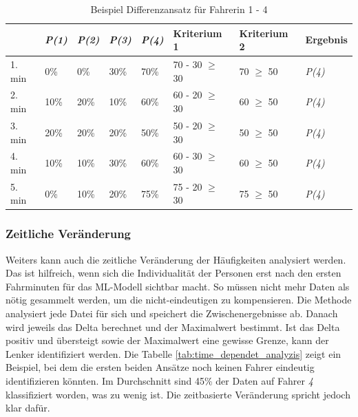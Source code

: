\begin{table}[htbp]
    \centering
    \caption{Beispiel Differenzansatz für Fahrerin 1 - 4}
    \label{tab:differencial_approach}
    \begin{tabular}{|l|l|l|l|l||l|l|l|}
        \hline
         & \textit{P(1)} & \textit{P(2)} & \textit{P(3)} & \textit{P(4)} & Kriterium 1 & Kriterium 2 & Ergebnis \\
        \hline
        1. min & 0\% & 0\% & 30\% & 70\% & 70 - 30 $\geq$ 30 & 70 $\geq$ 50 & \textit{P(4)} \\
        2. min & 10\% & 20\% & 10\% & 60\% & 60 - 20 $\geq$ 30 & 60 $\geq$ 50 & \textit{P(4)} \\
        3. min & 20\% & 20\% & 20\% & 50\% & 50 - 20 $\geq$ 30 & 50 $\geq$ 50 & \textit{P(4)} \\
        4. min & 10\% & 10\% & 30\% & 60\% & 60 - 30 $\geq$ 30 & 60 $\geq$ 50 & \textit{P(4)} \\
        5. min & 0\% & 10\% & 20\% & 75\% & 75 - 20 $\geq$ 30 & 75 $\geq$ 50 & \textit{P(4)} \\
        \hline
  \end{tabular}
\end{table}

\subsubsection{Zeitliche Veränderung}

Weiters kann auch die zeitliche Veränderung der Häufigkeiten analysiert werden. Das ist hilfreich, wenn sich die Individualität der Personen erst nach den ersten Fahrminuten für das ML-Modell sichtbar macht. So müssen nicht mehr Daten als nötig gesammelt werden, um die nicht-eindeutigen zu kompensieren. Die Methode analysiert jede Datei für sich und speichert die Zwischenergebnisse ab. Danach wird jeweils das Delta berechnet und der Maximalwert bestimmt. Ist das Delta positiv und übersteigt sowie der Maximalwert eine gewisse Grenze, kann der Lenker identifiziert werden. Die Tabelle \ref{tab:time_dependet_analyzis} zeigt ein Beispiel, bei dem die ersten beiden Ansätze noch keinen Fahrer eindeutig identifizieren könnten. Im Durchschnitt sind 45\% der Daten auf Fahrer \textit{4} klassifiziert worden, was zu wenig ist. Die zeitbasierte Veränderung spricht jedoch klar dafür.

